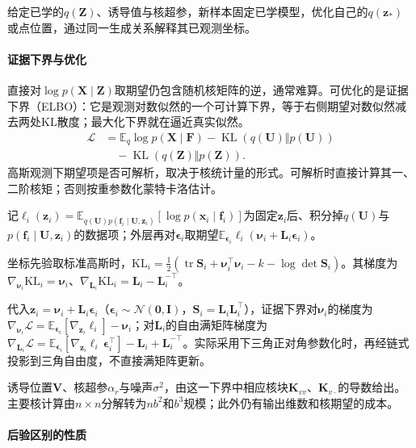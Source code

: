 给定已学的$q(\bm Z)$、诱导值与核超参，新样本固定已学模型，优化自己的$q(\bm z_*)$或点位置，通过同一生成关系解释其已观测坐标。

\paragraph{证据下界与优化}

直接对$\log p(\bm X\mid\bm Z)$取期望仍包含随机核矩阵的逆，通常难算。可优化的是证据下界（ELBO）：它是观测对数似然的一个可计算下界，等于右侧期望对数似然减去两处KL散度；最大化下界就在逼近真实似然。
\[
 \begin{aligned}
 \mathcal L
 &=\mathbb E_q\log p(\bm X\mid\bm F)
   -\operatorname{KL}(q(\bm U)\Vert p(\bm U))\\
 &\quad-\operatorname{KL}(q(\bm Z)\Vert p(\bm Z)).
 \end{aligned}
\]
高斯观测下期望项是否可解析，取决于核统计量的形式。可解析时直接计算其一、二阶核矩；否则按重参数化蒙特卡洛估计。

记$\ell_i(\bm z_i)=\mathbb E_{q(\bm U)p(\bm f_i\mid\bm U,\bm z_i)}[\log p(\bm x_i\mid\bm f_i)]$为固定$\bm z_i$后、积分掉$q(\bm U)$与$p(\bm f_i\mid\bm U,\bm z_i)$的数据项；外层再对$\bm\epsilon_i$取期望$\mathbb E_{\bm\epsilon_i}\ell_i(\bm\nu_i+\bm L_i\bm\epsilon_i)$。

坐标先验取标准高斯时，$\mathrm{KL}_i=\tfrac12(\operatorname{tr}\bm S_i+\bm\nu_i^\top\bm\nu_i-k-\log\det\bm S_i)$。其梯度为$\nabla_{\bm\nu_i}\mathrm{KL}_i=\bm\nu_i$、$\nabla_{\bm L_i}\mathrm{KL}_i=\bm L_i-\bm L_i^{-\top}$。

代入$\bm z_i=\bm\nu_i+\bm L_i\bm\epsilon_i$（$\bm\epsilon_i\sim\mathcal N(\bm0,\bm I)$，$\bm S_i=\bm L_i\bm L_i^\top$），证据下界对$\bm\nu_i$的梯度为$\nabla_{\bm\nu_i}\mathcal L=\mathbb E_{\bm\epsilon_i}[\nabla_{\bm z_i}\ell_i]-\bm\nu_i$；对$\bm L_i$的自由满矩阵梯度为$\nabla_{\bm L_i}\mathcal L=\mathbb E_{\bm\epsilon_i}[\nabla_{\bm z_i}\ell_i\,\bm\epsilon_i^\top]-\bm L_i+\bm L_i^{-\top}$。实际采用下三角正对角参数化时，再经链式投影到三角自由度，不直接满矩阵更新。

诱导位置$\bm V$、核超参$\alpha_r$与噪声$\sigma^2$，由这一下界中相应核块$\bm K_{vv}$、$\bm K_{v\cdot}$的导数给出。主要核计算由$n\times n$分解转为$n b^2$和$b^3$规模；此外仍有输出维数和核期望的成本。

\paragraph{后验区别的性质}

